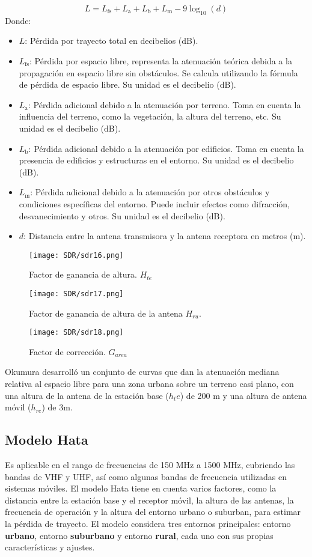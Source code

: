 \documentclass[
	12pt, %
	fleqn, %
	a4paper, %
	oneside, %
]{LegrandOrangeBook}
\begin{document}
\begin{equation}
L = L_{\text{fs}} + L_{\text{a}} + L_{\text{b}} + L_{\text{m}} - 9 \log_{10}(d)
\end{equation}
Donde:
\begin{itemize}
\item $L$: Pérdida por trayecto total en decibelios (dB).
\item $L_{\text{fs}}$: Pérdida por espacio libre, representa la atenuación teórica debida a la propagación en espacio libre sin obstáculos. Se calcula utilizando la fórmula de pérdida de espacio libre. Su unidad es el decibelio (dB).
\item $L_{\text{a}}$: Pérdida adicional debido a la atenuación por terreno. Toma en cuenta la influencia del terreno, como la vegetación, la altura del terreno, etc. Su unidad es el decibelio (dB).
\item $L_{\text{b}}$: Pérdida adicional debido a la atenuación por edificios. Toma en cuenta la presencia de edificios y estructuras en el entorno. Su unidad es el decibelio (dB).
\item $L_{\text{m}}$: Pérdida adicional debido a la atenuación por otros obstáculos y condiciones específicas del entorno. Puede incluir efectos como difracción, desvanecimiento y otros. Su unidad es el decibelio (dB).
\item $d$: Distancia entre la antena transmisora y la antena receptora en metros (m).
\end{itemize}
\begin{figure}[H]
\centering
\texttt{[image: SDR/sdr16.png]}
\caption{Factor de ganancia de altura. $H_{te}$}
\end{figure}
\begin{figure}[H]
\centering
\texttt{[image: SDR/sdr17.png]}
\caption{Factor de ganancia de altura de la antena $H_{ru}$.}
\end{figure}
\begin{figure}[H]
\centering
\texttt{[image: SDR/sdr18.png]}
\caption{Factor de corrección. $G_{area}$}
\end{figure}
\begin{notation}
Okumura desarrolló un conjunto de curvas que dan la atenuación mediana relativa al espacio libre para una zona urbana sobre un terreno casi plano, con una altura de la antena de la estación base ($h_te$) de 200 m y una altura de antena móvil ($h_{re}$) de 3m.
\end{notation}
\subsection{Modelo Hata}
Es aplicable en el rango de frecuencias de 150 MHz a 1500 MHz, cubriendo las bandas de VHF y UHF, así como algunas bandas de frecuencia utilizadas en sistemas móviles. El modelo Hata tiene en cuenta varios factores, como la distancia entre la estación base y el receptor móvil, la altura de las antenas, la frecuencia de operación y la altura del entorno urbano o suburban, para estimar la pérdida de trayecto. El modelo considera tres entornos principales: entorno \textbf{urbano}, entorno \textbf{suburbano} y entorno \textbf{rural}, cada uno con sus propias características y ajustes.
\end{document}
